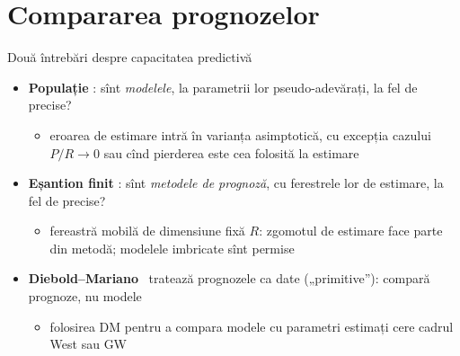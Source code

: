 \section{Compararea prognozelor}

\begin{frame}{Două întrebări despre capacitatea predictivă}
\itemsize{\small}
\begin{itemize}
    \item \textbf{Populație} : sînt \emph{modelele}, la parametrii lor pseudo-adevărați, la fel de precise?
    \begin{itemize}
        \item eroarea de estimare intră în varianța asimptotică, cu excepția cazului $P/R \to 0$ sau cînd pierderea este cea folosită la estimare
    \end{itemize}
    \item \textbf{Eșantion finit} : sînt \emph{metodele de prognoză}, cu ferestrele lor de estimare, la fel de precise?
    \begin{itemize}
        \item fereastră mobilă de dimensiune fixă $R$: zgomotul de estimare face parte din metodă; modelele imbricate sînt permise
    \end{itemize}
    \item \textbf{Diebold--Mariano} \ tratează prognozele ca date („primitive”): compară prognoze, nu modele 
    \begin{itemize}
        \item folosirea DM pentru a compara modele cu parametri estimați cere cadrul West sau GW
    \end{itemize}
\end{itemize}
\end{frame}


